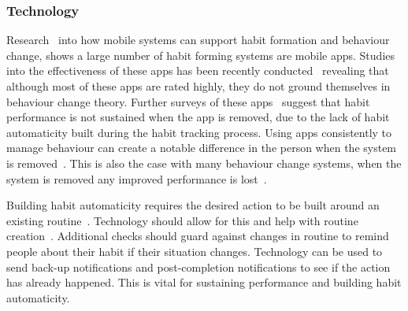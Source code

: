 \subsubsection*{Technology}
Research~\cite{survey_on_apps_2,survey_on_current_apps_of_steel} into how mobile systems can support habit formation and behaviour change, shows a large number of habit forming systems are mobile apps. Studies into the effectiveness of these apps has been recently conducted~\cite{article_beyond_self_tracking_designing_apps, article_dont_kick_habit} revealing that although most of these apps are rated highly, they do not ground themselves in behaviour change theory. Further surveys of these apps~\cite{survey_on_current_apps_of_steel,survey_on_apps_2} suggest that habit performance is not sustained when the app is removed, due to the lack of habit automaticity built during the habit tracking process. Using apps consistently to manage behaviour can create a notable difference in the person when the system is removed~\cite{article_my_phone_is_part_of_my_soul}. This is also the case with many behaviour change systems, when the system is removed any improved performance is lost~\cite{article_dont_kick_habit, article_realtime_feedback_improving_medication_taking}.


Building habit automaticity requires the desired action to be built around an existing routine~\cite{article_how_habits_formed_modelling_habit_formation, article_implementation_intentions_multicue}. Technology should allow for this and help with routine creation~\cite{article_dont_forget_your_pill}. Additional checks should guard against changes in routine to remind people about their habit if their situation changes. Technology can be used to send back-up notifications and post-completion notifications to see if the action has already happened. This is vital for sustaining performance and building habit automaticity.


